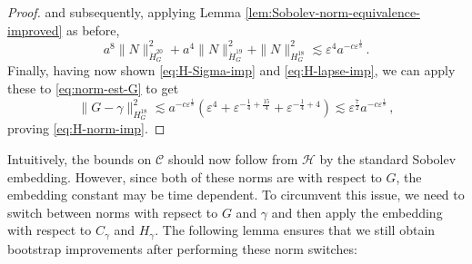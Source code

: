 \documentclass[11pt,leqno,textwidth=10cm]{amsart}
\numberwithin{equation}{section}
\theoremstyle{definition}
\theoremstyle{plain}
\newcommand{\1}{\mathbbm{1}}
\renewcommand{\epsilon}{\varepsilon}
\begin{document}
\begin{proof}
and subsequently, applying Lemma \ref{lem:Sobolev-norm-equivalence-improved} as before,
\begin{equation*}
a^8\|N\|^2_{\dot{H}^{20}_G}+a^4\|N\|^2_{\dot{H}^{19}_G}+\|N\|^2_{H^{18}_G}\lesssim\epsilon^4a^{-c\epsilon^\frac18}\,.
\end{equation*}
Finally, having now shown \eqref{eq:H-Sigma-imp} and \eqref{eq:H-lapse-imp}, we can apply these to \eqref{eq:norm-est-G} to get
\begin{equation*}
\|G-\gamma\|^2_{H^{18}_G}\lesssim a^{-c\epsilon^\frac18}\left(\epsilon^4+\epsilon^{-\frac14+\frac{15}4}+\epsilon^{-\frac14+4}\right)\lesssim\epsilon^\frac{7}2a^{-c\epsilon^\frac18}\,,
\end{equation*}
proving \eqref{eq:H-norm-imp}.
\end{proof}

Intuitively, the bounds on $\mathcal{C}$ should now follow from $\mathcal{H}$ by the standard Sobolev embedding. However, since both of these norms are with respect to $G$, the embedding constant may be time dependent. To circumvent this issue, we need to switch between norms with repsect to $G$ and $\gamma$ and then apply the embedding with respect to $C_\gamma$ and $H_\gamma$. The following lemma ensures that we still obtain bootstrap improvements after performing these norm switches:
\end{document}
